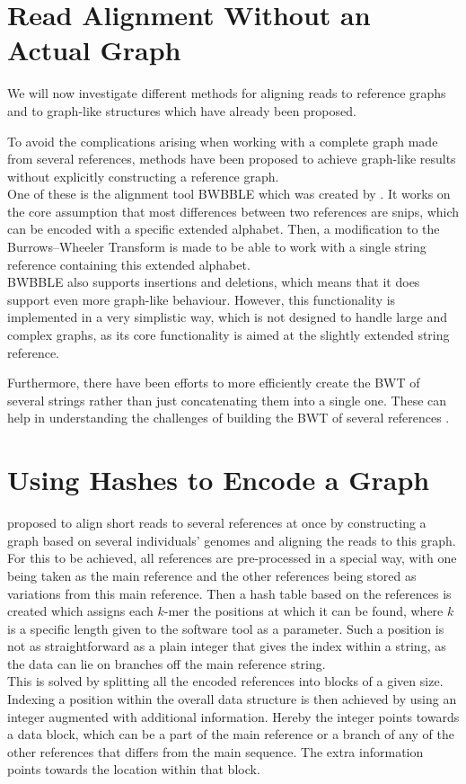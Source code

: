 \documentclass[a4paper,12pt,twoside,BCOR=10mm]{scrbook}
\begin{document}
\section{Read Alignment Without an Actual Graph}

We will now investigate different methods for aligning reads to reference graphs and to graph-like structures
which have already been proposed.

To avoid the complications arising when working with
a complete graph made from several references, methods have been proposed
to achieve graph-like results without explicitly constructing a reference graph. \\
One of these is the alignment tool BWBBLE which
was created by \citet{Huang2013}.
It works on the core assumption that most differences between two references
are snips, which can be encoded with a specific extended alphabet.
Then, a modification to the Burrows--Wheeler Transform is made to
be able to work with a single string reference containing this extended alphabet. \\
BWBBLE also supports insertions and deletions, which means that it does support
even more graph-like behaviour.
However, this functionality is implemented in a very simplistic way,
which is not designed to handle large and complex graphs,
as its core functionality is aimed at the slightly extended string reference.

Furthermore, there have been efforts to more efficiently create the BWT
of several strings rather than just concatenating them into a single one.
These can help in understanding the challenges of building the BWT of several references \citep{Holt2014}.

\section{Using Hashes to Encode a Graph}

\citet{Schneeberger2009} proposed to
align short reads to several references at once
by constructing a graph based on several individuals' genomes
and aligning the reads to this graph. \\
For this to be achieved, all references are pre-processed in a special way, with one being taken as the
main reference and the other references being stored as variations from this main reference.
Then a hash table based on the references is created which
assigns each $ k $-mer the positions at which it can be found,
where $ k $ is a specific length given to the software tool as a parameter.
Such a position is not as straightforward as a
plain integer that gives the index within a string, as the data can lie on branches
off the main reference string. \\
This is solved by splitting all the encoded references into blocks of a given size.
Indexing a position within the overall data structure is then achieved
by using an integer augmented with additional information.
Hereby the integer points towards a data block, which can be a part of the main
reference or a branch of any of the other references that differs from the
main sequence. The extra information points towards the location within that block.
\end{document}
